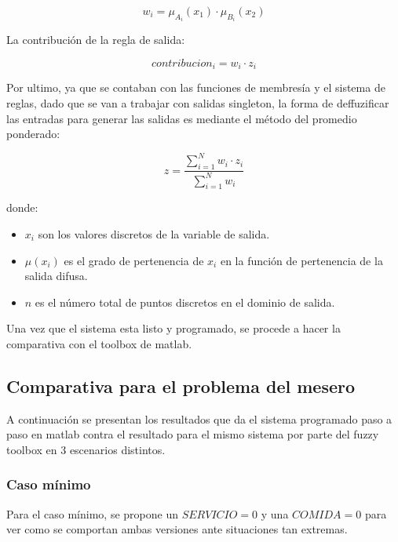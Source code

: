 \documentclass[11pt, letterpaper]{article}
\begin{document}
$$
w_i = \mu_{A_i}(x_1) \cdot \mu_{B_i}(x_2)
$$

La contribución de la regla de salida:

$$
contribucion_i = w_i \cdot z_i
$$

Por ultimo, ya que se contaban con las funciones de membresía y el sistema de reglas, dado que se van a trabajar con salidas singleton, la forma de deffuzificar las entradas para generar las salidas es mediante el método del promedio ponderado:


$$
z = \frac{\sum_{i=1}^{N} w_i \cdot z_i}{\sum_{i=1}^{N} w_i}
$$




donde:

\begin{itemize}
	\item \( x_i \) son los valores discretos de la variable de salida.
	\item \( \mu(x_i) \) es el grado de pertenencia de \( x_i \) en la función de pertenencia de la salida difusa.
	\item \( n \) es el número total de puntos discretos en el dominio de salida.
\end{itemize}

Una vez que el sistema esta listo y programado, se procede a hacer la comparativa con el toolbox de matlab.

\newpage

\subsection{Comparativa para el problema del mesero}

A continuación se presentan los resultados que da el sistema programado paso a paso en matlab contra el resultado para el mismo sistema por parte del fuzzy toolbox en 3 escenarios distintos.

\subsubsection{Caso mínimo}

Para el caso mínimo, se propone un $SERVICIO = 0$ y una $COMIDA = 0$ para ver como se comportan ambas versiones ante situaciones tan extremas.
\end{document}
